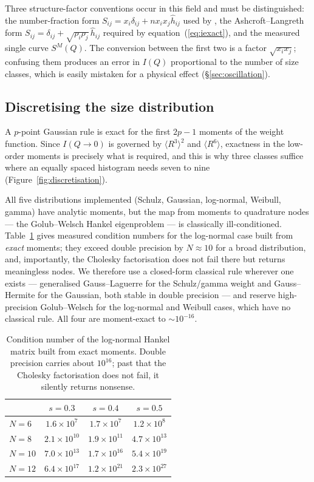 \documentclass[11pt,a4paper]{article}
\newcommand{\Q}{Q}
\begin{document}
Three structure-factor conventions occur in this field and must be
distinguished: the number-fraction form
$S_{ij} = x_i\delta_{ij} + n x_i x_j \hat h_{ij}$ used by \citet{DAguannoKlein1991},
the Ashcroft--Langreth form
$S_{ij} = \delta_{ij} + \sqrt{\rho_i\rho_j}\,\hat h_{ij}$ required by
equation~(\ref{eq:iexact}), and the measured single curve $S^{M}(\Q)$. The
conversion between the first two is a factor $\sqrt{x_i x_j}$; confusing them
produces an error in $I(\Q)$ proportional to the number of size classes, which
is easily mistaken for a physical effect (\S\ref{sec:oscillation}).

\subsection{Discretising the size distribution}
\label{sec:nodes}

A $p$-point Gaussian rule is exact for the first $2p-1$ moments of the weight
function. Since $I(\Q\to0)$ is governed by $\langle R^3\rangle^2$ and
$\langle R^6\rangle$, exactness in the low-order moments is precisely what is
required, and this is why three classes suffice where an equally spaced
histogram needs seven to nine (Figure~\ref{fig:discretisation}).

All five distributions implemented (Schulz, Gaussian, log-normal, Weibull,
gamma)
have analytic moments, but the map from moments to quadrature nodes --- the
Golub--Welsch Hankel eigenproblem --- is classically ill-conditioned.
Table~\ref{tab:cond} gives measured condition numbers for the log-normal case
built from \emph{exact} moments; they exceed double precision by $N\approx10$
for a broad distribution, and, importantly, the Cholesky factorisation does
not fail there but returns meaningless nodes. We therefore use a closed-form
classical rule wherever one exists --- generalised Gauss--Laguerre for the
Schulz/gamma weight and Gauss--Hermite for the Gaussian, both stable in double
precision --- and reserve high-precision Golub--Welsch for the log-normal and
Weibull cases, which have no classical rule. All four are moment-exact to
$\sim10^{-16}$.

\begin{table}[htbp]
\centering
\caption{Condition number of the log-normal Hankel matrix built from exact
moments. Double precision carries about $10^{16}$; past that the Cholesky
factorisation does not fail, it silently returns nonsense.}
\label{tab:cond}
\begin{tabular}{lccc}
\toprule
 & $s=0.3$ & $s=0.4$ & $s=0.5$\\
\midrule
$N=6$  & $1.6\times10^{7}$  & $1.7\times10^{7}$  & $1.2\times10^{8}$\\
$N=8$  & $2.1\times10^{10}$ & $1.9\times10^{11}$ & $4.7\times10^{13}$\\
$N=10$ & $7.0\times10^{13}$ & $1.7\times10^{16}$ & $5.4\times10^{19}$\\
$N=12$ & $6.4\times10^{17}$ & $1.2\times10^{21}$ & $2.3\times10^{27}$\\
\bottomrule
\end{tabular}
\end{table}
\end{document}
